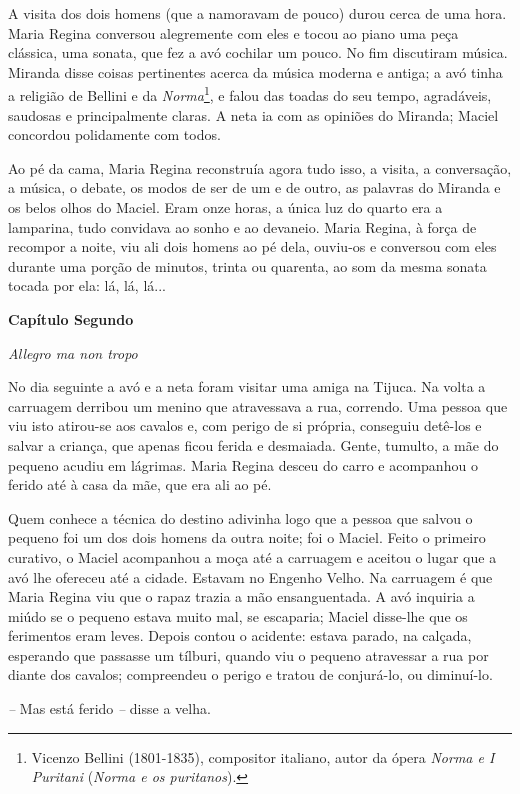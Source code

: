 A visita dos dois homens (que a namoravam de pouco) durou cerca de uma
hora. Maria Regina conversou alegremente com eles e tocou ao piano uma
peça clássica, uma sonata, que fez a avó cochilar um pouco. No fim
discutiram música. Miranda disse coisas pertinentes acerca da música
moderna e antiga; a avó tinha a religião de Bellini e da
\emph{Norma}\footnote{Vicenzo Bellini (1801-1835), compositor italiano,
  autor da ópera \emph{Norma e I Puritani} (\emph{Norma e os
  puritanos}).}, e falou das toadas do seu tempo, agradáveis, saudosas e
principalmente claras. A neta ia com as opiniões do Miranda; Maciel
concordou polidamente com todos.

Ao pé da cama, Maria Regina reconstruía agora tudo isso, a visita, a
conversação, a música, o debate, os modos de ser de um e de outro, as
palavras do Miranda e os belos olhos do Maciel. Eram onze horas, a única
luz do quarto era a lamparina, tudo convidava ao sonho e ao devaneio.
Maria Regina, à força de recompor a noite, viu ali dois homens ao pé
dela, ouviu-os e conversou com eles durante uma porção de minutos,
trinta ou quarenta, ao som da mesma sonata tocada por ela: lá, lá, lá...

\textbf{Capítulo Segundo}

\emph{Allegro ma non tropo}

No dia seguinte a avó e a neta foram visitar uma amiga na Tijuca. Na
volta a carruagem derribou um menino que atravessava a rua, correndo.
Uma pessoa que viu isto atirou-se aos cavalos e, com perigo de si
própria, conseguiu detê-los e salvar a criança, que apenas ficou ferida
e desmaiada. Gente, tumulto, a mãe do pequeno acudiu em lágrimas. Maria
Regina desceu do carro e acompanhou o ferido até à casa da mãe, que era
ali ao pé.

Quem conhece a técnica do destino adivinha logo que a pessoa que salvou
o pequeno foi um dos dois homens da outra noite; foi o Maciel. Feito o
primeiro curativo, o Maciel acompanhou a moça até a carruagem e aceitou
o lugar que a avó lhe ofereceu até a cidade. Estavam no Engenho Velho.
Na carruagem é que Maria Regina viu que o rapaz trazia a mão
ensanguentada. A avó inquiria a miúdo se o pequeno estava muito mal, se
escaparia; Maciel disse-lhe que os ferimentos eram leves. Depois contou
o acidente: estava parado, na calçada, esperando que passasse um
tílburi, quando viu o pequeno atravessar a rua por diante dos cavalos;
compreendeu o perigo e tratou de conjurá-lo, ou diminuí-lo.

\emph{--} Mas está ferido \emph{--} disse a velha.

